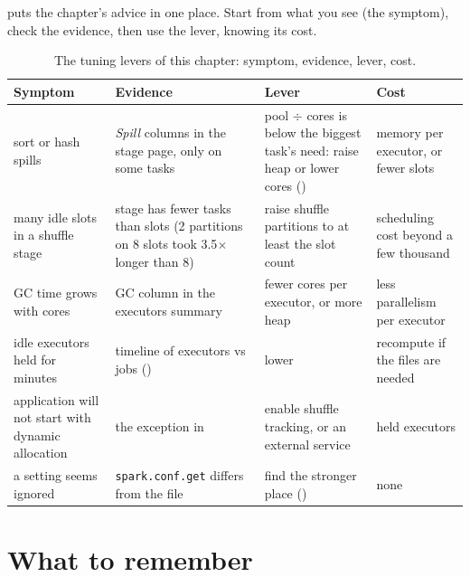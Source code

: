  puts the chapter's advice in one place. Start from what you
see (the symptom), check the evidence, then use the lever, knowing its cost.

\begin{table}[htbp]
\centering\footnotesize
\renewcommand{\arraystretch}{1.25}
\begin{tabular}{@{}P{3.1cm}P{3.7cm}P{4.1cm}P{3.2cm}@{}}
\toprule
\textbf{Symptom} & \textbf{Evidence} & \textbf{Lever} & \textbf{Cost} \\
\midrule
sort or hash spills & \emph{Spill} columns in the stage page, only on some tasks & pool $\div$ cores is below the biggest task's need: raise heap or lower cores () & memory per executor, or fewer slots \\
many idle slots in a shuffle stage & stage has fewer tasks than slots (2 partitions on 8 slots took 3.5$\times$ longer than 8) & raise shuffle partitions to at least the slot count & scheduling cost beyond a few thousand \\
GC time grows with cores & GC column in the executors summary & fewer cores per executor, or more heap & less parallelism per executor \\
idle executors held for minutes & timeline of executors vs jobs () & lower  & recompute if the files are needed \\
application will not start with dynamic allocation & the exception in  & enable shuffle tracking, or an external service & held executors \\
a setting seems ignored & \texttt{spark.conf.get} differs from the file & find the stronger place () & none \\
\bottomrule
\end{tabular}
\caption{The tuning levers of this chapter: symptom, evidence, lever, cost.}
\label{tab:tuning-levers}
\end{table}

\section{What to remember}
\label{sec:tuning-summary}

